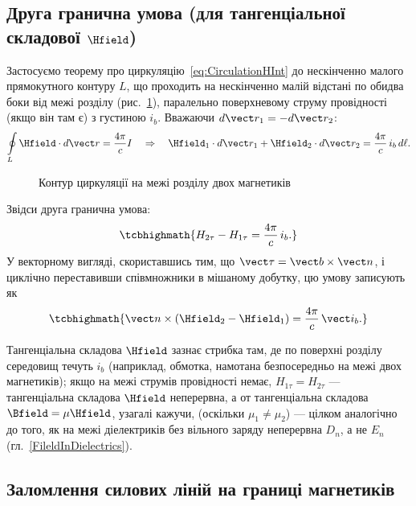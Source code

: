 \subsection*{Друга гранична умова (для тангенціальної складової $\Hfield$)}

Застосуємо теорему про циркуляцію~\eqref{eq:CirculationHInt} до нескінченно малого прямокутного контуру $L$, що проходить на нескінченно малій
відстані по обидва боки від межі розділу (рис.~\ref{pic:BC2Mag}), паралельно поверхневому струму провідності (якщо він там є) з густиною $i_b$.
Вважаючи $d\vect r_1 = -d\vect r_2$:
\begin{equation*}
	\oint\limits_L \Hfield\cdot d\vect r = \frac{4\pi}c I \quad\Rightarrow\quad \Hfield_1\cdot d\vect r_1 + \Hfield_2\cdot d\vect r_2 =
	\frac{4\pi}c\, i_b\, d\ell.
\end{equation*}

\begin{figure}[h!]\centering
	\caption{Контур циркуляції на межі розділу двох магнетиків\label{pic:BC2Mag}}
\end{figure}

Звідси друга гранична умова:
\begin{equation}\label{eq:BC2MagneticScalar}
	\tcbhighmath{
		H_{2\tau} - H_{1\tau} = \frac{4\pi}c\, i_b.
	}
\end{equation}
У векторному вигляді, скориставшись тим, що $\vect\tau = \vect b\times\vect n$, і циклічно переставивши співмножники в мішаному добутку, цю умову
записують як
\begin{equation}\label{eq:BC2MagneticVector}
	\tcbhighmath{
		\vect n\times\left(\Hfield_2 - \Hfield_1\right) = \frac{4\pi}c\, \vect i_b.
	}
\end{equation}

\begin{Attention}
	Тангенціальна складова $\Hfield$ зазнає стрибка  там, де по поверхні розділу середовищ течуть  $i_b$
	(наприклад, обмотка, намотана безпосередньо на межі двох магнетиків); якщо на межі струмів провідності немає, $H_{1\tau}=H_{2\tau}$ ---
	тангенціальна складова $\Hfield$ неперервна, а от тангенціальна складова $\Bfield = \mu\Hfield$, узагалі кажучи,  (оскільки
	$\mu_1\neq\mu_2$) --- цілком аналогічно до того, як на межі діелектриків без вільного заряду неперервна $D_n$, а не $E_n$
	(гл.~\ref{FileldInDielectrics}).
\end{Attention}

\subsection*{Заломлення силових ліній на границі магнетиків}

